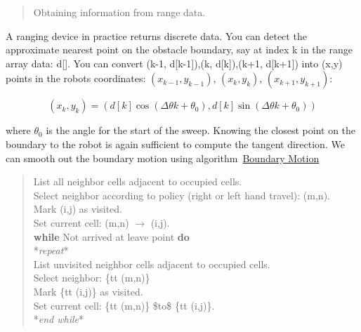 \begin{quote}
Obtaining information from range data.
\end{quote}

A ranging device in practice returns discrete data. You can detect the
approximate nearest point on the obstacle boundary, say at index k in
the range array data: d{[}{]}. You can convert (k-1, d{[}k-1{]}),(k,
d{[}k{]}),(k+1, d{[}k+1{]}) into (x,y) points in the robots coordinates:
\((x_{k-1}, y_{k-1})\), \((x_{k}, y_{k})\), \((x_{k+1}, y_{k+1})\):

\[(x_k,y_k) = \left(d[k] \cos (\Delta \theta k + \theta_0), d[k] \sin (\Delta \theta k + \theta_0)\right)\]

where \(\theta_0\) is the angle for the start of the sweep. Knowing the
closest point on the boundary to the robot is again sufficient to
compute the tangent direction. We can smooth out the boundary motion
using algorithm~\href{alg:boundarymotion}{Boundary Motion}

\begin{quote}
List all neighbor cells adjacent to occupied cells.\\
Select neighbor according to policy (right or left hand travel):
(m,n).\\
Mark (i,j) as visited.\\
Set current cell: (m,n) \(\to\) (i,j).\\
\textbf{while} Not arrived at leave point \textbf{do}\\
\hspace*{0.333em}\hspace*{0.333em}*\emph{repeat}*\\
\hspace*{0.333em}\hspace*{0.333em}\hspace*{0.333em}\hspace*{0.333em}List
unvisited neighbor cells adjacent to occupied cells.\\
\hspace*{0.333em}\hspace*{0.333em}\hspace*{0.333em}\hspace*{0.333em}Select
neighbor: \{tt (m,n)\}\\
\hspace*{0.333em}\hspace*{0.333em}\hspace*{0.333em}\hspace*{0.333em}Mark
\{tt (i,j)\} as visited.\\
\hspace*{0.333em}\hspace*{0.333em}\hspace*{0.333em}\hspace*{0.333em}Set
current cell: \{tt (m,n)\} \$to\$ \{tt (i,j)\}.\\
\hspace*{0.333em}\hspace*{0.333em}*\emph{end while}*
\end{quote}

